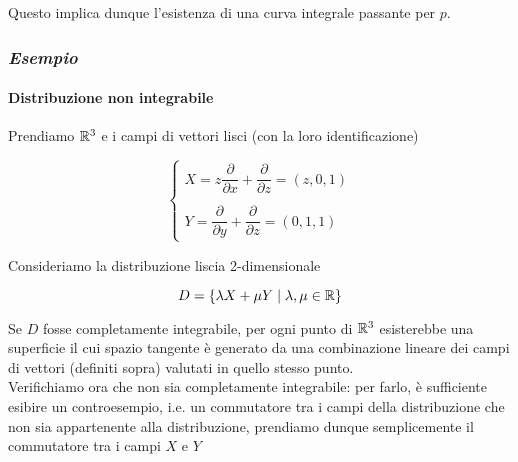 Questo implica dunque l'esistenza di una curva integrale passante per $ p $.

\subsubsection{\textit{Esempio}}

\paragraph{Distribuzione non integrabile}

Prendiamo $ \mathbb{R}^{3} $ e i campi di vettori lisci (con la loro identificazione)

\begin{equation}
	\begin{cases}
		X = z \dfrac{\partial}{\partial x} + \dfrac{\partial}{\partial z} = (z,0,1)\\\\
		Y = \dfrac{\partial}{\partial y} + \dfrac{\partial}{\partial z} = (0,1,1)
	\end{cases}
\end{equation}

Consideriamo la distribuzione liscia 2-dimensionale

\begin{equation}
	D = \{ \lambda X + \mu Y \mid \lambda,\mu \in \mathbb{R} \}
\end{equation}

Se $ D $ fosse completamente integrabile, per ogni punto di $ \mathbb{R}^{3} $ esisterebbe una superficie il cui spazio tangente è generato da una combinazione lineare dei campi di vettori (definiti sopra) valutati in quello stesso punto.\\
Verifichiamo ora che non sia completamente integrabile: per farlo, è sufficiente esibire un controesempio, i.e. un commutatore tra i campi della distribuzione che non sia appartenente alla distribuzione, prendiamo dunque semplicemente il commutatore tra i campi $ X $ e $ Y $

